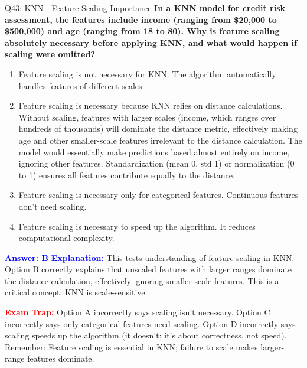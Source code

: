 \documentclass[8pt]{beamer}
\begin{document}
	\begin{frame}{Q43: KNN - Feature Scaling Importance}
		\fontsize{6.5}{7.5}\selectfont
		\textbf{In a KNN model for credit risk assessment, the features include income (ranging from \$20,000 to \$500,000) and age (ranging from 18 to 80). Why is feature scaling absolutely necessary before applying KNN, and what would happen if scaling were omitted?}
		
		\begin{enumerate}
			\item Feature scaling is not necessary for KNN. The algorithm automatically handles features of different scales.
			\item Feature scaling is necessary because KNN relies on distance calculations. Without scaling, features with larger scales (income, which ranges over hundreds of thousands) will dominate the distance metric, effectively making age and other smaller-scale features irrelevant to the distance calculation. The model would essentially make predictions based almost entirely on income, ignoring other features. Standardization (mean 0, std 1) or normalization (0 to 1) ensures all features contribute equally to the distance.
			\item Feature scaling is necessary only for categorical features. Continuous features don't need scaling.
			\item Feature scaling is necessary to speed up the algorithm. It reduces computational complexity.
		\end{enumerate}
		
		\vspace{0.1cm}
		\textcolor{blue}{\textbf{Answer: B}}
		\vspace{0.1cm}
		\textcolor{blue}{\textbf{Explanation:}} This tests understanding of feature scaling in KNN. Option B correctly explains that unscaled features with larger ranges dominate the distance calculation, effectively ignoring smaller-scale features. This is a critical concept: KNN is scale-sensitive.
		
		\textcolor{red}{\textbf{Exam Trap:}} Option A incorrectly says scaling isn't necessary. Option C incorrectly says only categorical features need scaling. Option D incorrectly says scaling speeds up the algorithm (it doesn't; it's about correctness, not speed). Remember: Feature scaling is essential in KNN; failure to scale makes larger-range features dominate.
	\end{frame}
	
\end{document}
